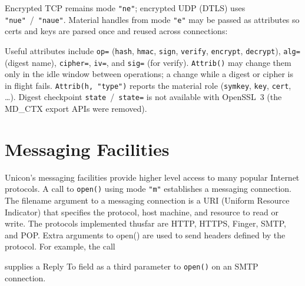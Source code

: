 
Encrypted TCP remains mode \texttt{"ne"}; encrypted UDP (DTLS) uses
\texttt{"nue"}~/~\texttt{"naue"}. Material handles from mode
\texttt{"e"} may be passed as attributes so certs and keys are parsed
once and reused across connections:


Useful attributes include \texttt{op=} (\texttt{hash}, \texttt{hmac},
\texttt{sign}, \texttt{verify}, \texttt{encrypt}, \texttt{decrypt}),
\texttt{alg=} (digest name), \texttt{cipher=}, \texttt{iv=}, and
\texttt{sig=} (for verify). \texttt{Attrib()} may change them only in
the idle window between operations; a change while a digest or cipher
is in flight fails. \texttt{Attrib(h, "type")} reports the material
role (\texttt{symkey}, \texttt{key}, \texttt{cert}, \ldots).
Digest checkpoint \texttt{state}~/~\texttt{state=} is not available
with OpenSSL~3 (the MD\_CTX export APIs were removed).

\section{Messaging Facilities}

Unicon's messaging facilities provide
higher level access to many popular Internet protocols. A call to
\texttt{open()} using mode \texttt{"m"}
establishes a messaging connection. The filename argument to a
messaging connection is a URI (Uniform Resource Indicator) that
specifies the protocol, host machine, and resource to read or write.
The protocols implemented thusfar are HTTP, HTTPS, Finger, SMTP, and POP.
Extra arguments to open() are used to send headers defined by the
protocol. For example, the call


\noindent
supplies a Reply To field as a third parameter to \texttt{open()} on an
SMTP connection.

